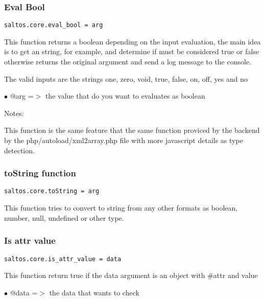 \documentclass[a4paper]{article}
\begin{document}
\hypertarget{toc709}{}
\subsubsection{Eval Bool}

\begin{lstlisting}
saltos.core.eval_bool = arg
\end{lstlisting}

This function returns a boolean depending on the input evaluation, the main idea
is to get an string, for example, and determine if must be considered true or false
otherwise returns the original argument and send a log message to the console.

The valid inputs are the strings one, zero, void, true, false, on, off, yes and no

\begin{compactitem}
\item[\color{myblue}$\bullet$] @arg =$>$ the value that do you want to evaluates as boolean
\end{compactitem}

Notes:

This function is the same feature that the same function proviced by the backend by the
php/autoload/xml2array.php file with more javascript details as type detection.

\hypertarget{toc710}{}
\subsubsection{toString function}

\begin{lstlisting}
saltos.core.toString = arg
\end{lstlisting}

This function tries to convert to string from any other formats as boolean,
number, null, undefined or other type.

\hypertarget{toc711}{}
\subsubsection{Is attr value}

\begin{lstlisting}
saltos.core.is_attr_value = data
\end{lstlisting}

This function return true if the data argument is an object with \#attr and value

\begin{compactitem}
\item[\color{myblue}$\bullet$] @data =$>$ the data that wants to check
\end{compactitem}
\end{document}
